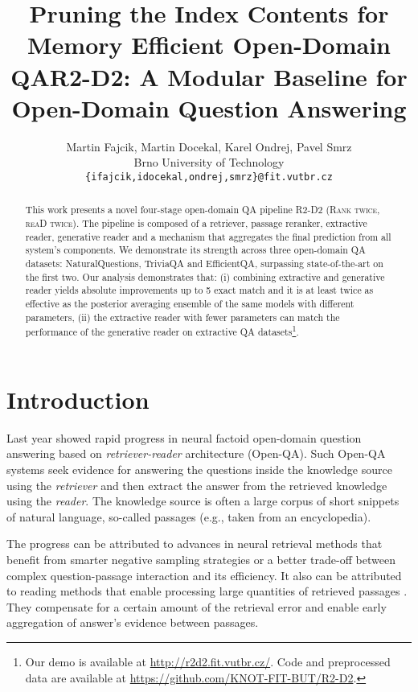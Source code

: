 \documentclass[11pt]{article}
\title{Pruning the Index Contents for Memory Efficient Open-Domain QA}
\title{R2-D2: A Modular Baseline for Open-Domain Question Answering}
\author{Martin Fajcik, Martin Docekal, Karel Ondrej, Pavel Smrz\\
  Brno University of Technology\\
{\tt \{ifajcik,idocekal,ondrej,smrz\}@fit.vutbr.cz} }
\begin{document}
\maketitle

\begin{abstract}
This work presents a novel four-stage open-domain QA pipeline R2-D2 (\textsc{Rank twice}, \textsc{reaD twice}). The pipeline is composed of a retriever, passage reranker, extractive reader, generative reader and a mechanism that aggregates the final prediction from all system's components. We demonstrate its strength across three open-domain QA datasets: NaturalQuestions, TriviaQA and EfficientQA, surpassing state-of-the-art on the first two. Our analysis demonstrates that: (i) combining extractive and generative reader yields absolute improvements up to 5 exact match and it is at least twice as effective as the posterior averaging ensemble of the same models with different parameters, (ii) the extractive reader with fewer parameters can match the performance of the generative reader on extractive QA datasets\footnote{Our demo is available at \url{http://r2d2.fit.vutbr.cz/}. Code and preprocessed data are available at \url{https://github.com/KNOT-FIT-BUT/R2-D2}.}.
\end{abstract}






\section{Introduction}


Last year showed rapid progress in neural factoid open-domain question answering based on \emph{retriever-reader} architecture (Open-QA).
Such Open-QA systems \cite{chen2017reading} seek evidence for answering the questions inside the knowledge source using the \emph{retriever} and then extract the answer from the retrieved knowledge using the \emph{reader}. The knowledge source is often a large corpus of short snippets of natural language, so-called passages (e.g., taken from an encyclopedia). 


The progress can be attributed to advances in neural retrieval methods \cite[\textit{inter alia}]{karpukhin2020dense, izacard2020distilling, khattab2020relevance, luan2020sparse, xiong2020approximate} that benefit from smarter negative sampling strategies or a better trade-off between complex question-passage interaction and its efficiency. It also can be attributed to reading methods that enable processing large quantities of retrieved passages \citet{izacard2020leveraging}. They compensate for a certain amount of the retrieval error and enable early aggregation of answer's evidence between passages.
\end{document}
